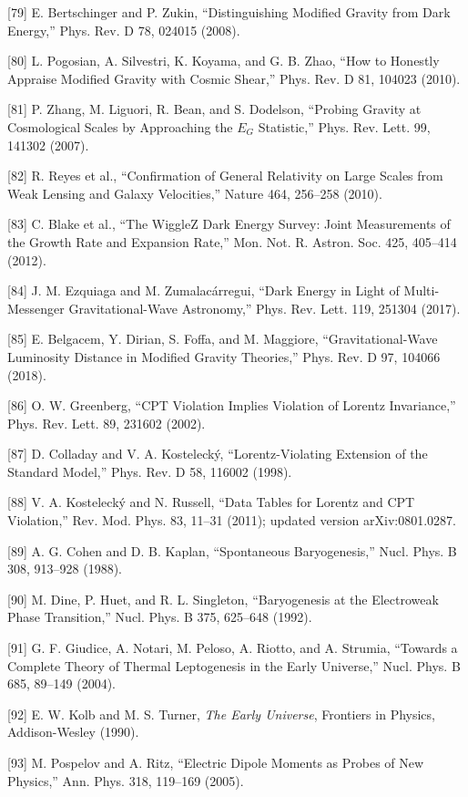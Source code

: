 \documentclass[aps,prd,onecolumn,superscriptaddress,nofootinbib,longbibliography,10pt]{revtex4-2}
\begin{document}
  [79] E. Bertschinger and P. Zukin, “Distinguishing Modified Gravity from Dark Energy,” Phys. Rev. D 78, 024015 (2008).


  [80] L. Pogosian, A. Silvestri, K. Koyama, and G. B. Zhao, “How to Honestly Appraise Modified Gravity with Cosmic Shear,” Phys. Rev. D 81, 104023 (2010).


  [81] P. Zhang, M. Liguori, R. Bean, and S. Dodelson, “Probing Gravity at Cosmological Scales by Approaching the \(E_G\) Statistic,” Phys. Rev. Lett. 99, 141302 (2007).


  [82] R. Reyes et al., “Confirmation of General Relativity on Large Scales from Weak Lensing and Galaxy Velocities,” Nature 464, 256–258 (2010).


  [83] C. Blake et al., “The WiggleZ Dark Energy Survey: Joint Measurements of the Growth Rate and Expansion Rate,” Mon. Not. R. Astron. Soc. 425, 405–414 (2012).


  [84] J. M. Ezquiaga and M. Zumalacárregui, “Dark Energy in Light of Multi-Messenger Gravitational-Wave Astronomy,” Phys. Rev. Lett. 119, 251304 (2017).


  [85] E. Belgacem, Y. Dirian, S. Foffa, and M. Maggiore, “Gravitational-Wave Luminosity Distance in Modified Gravity Theories,” Phys. Rev. D 97, 104066 (2018).


  [86] O. W. Greenberg, “CPT Violation Implies Violation of Lorentz Invariance,” Phys. Rev. Lett. 89, 231602 (2002).


  [87] D. Colladay and V. A. Kostelecký, “Lorentz-Violating Extension of the Standard Model,” Phys. Rev. D 58, 116002 (1998).


  [88] V. A. Kostelecký and N. Russell, “Data Tables for Lorentz and CPT Violation,” Rev. Mod. Phys. 83, 11–31 (2011); updated version arXiv:0801.0287.


  [89] A. G. Cohen and D. B. Kaplan, “Spontaneous Baryogenesis,” Nucl. Phys. B 308, 913–928 (1988).


  [90] M. Dine, P. Huet, and R. L. Singleton, “Baryogenesis at the Electroweak Phase Transition,” Nucl. Phys. B 375, 625–648 (1992).


  [91] G. F. Giudice, A. Notari, M. Peloso, A. Riotto, and A. Strumia, “Towards a Complete Theory of Thermal Leptogenesis in the Early Universe,” Nucl. Phys. B 685, 89–149 (2004).


  [92] E. W. Kolb and M. S. Turner, \textit{The Early Universe}, Frontiers in Physics, Addison-Wesley (1990).


  [93] M. Pospelov and A. Ritz, “Electric Dipole Moments as Probes of New Physics,” Ann. Phys. 318, 119–169 (2005).
\end{document}
